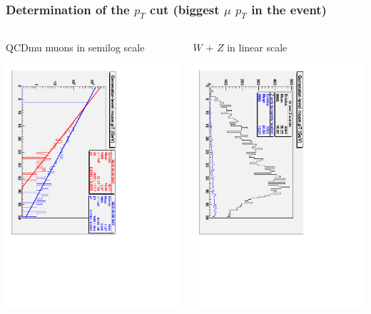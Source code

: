 \documentclass[compress]{beamer}
\begin{document}
\begin{frame}
\frametitle{Determination of the $p_T$ cut (biggest $\mu$ $p_T$ in the event)}

\vspace{-0.35 cm}
\begin{columns}
\begin{center}
QCDmu muons in semilog scale

\includegraphics[height=\linewidth, angle=90]{exponential_qcd.pdf}
\end{center}

\begin{center}
$W$ + $Z$ in linear scale

\includegraphics[height=\linewidth, angle=90]{w_and_z.pdf}
\end{center}
\end{columns}


\end{frame}
\end{document}
